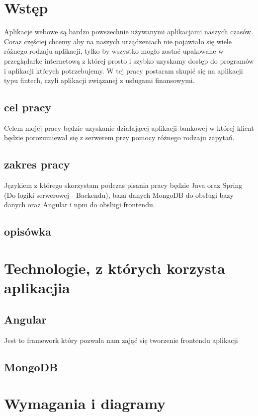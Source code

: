\documentclass[a4paper,11pt,twoside]{mgr}
\begin{document}
\pagestyle{empty}
\stronaTytulowa
\cleardoublepage

\tableofcontents

\pagestyle{fancy}

\chapter*{Wstęp}
Aplikacje webowe są bardzo powszechnie używanymi aplikacjami naszych czasów. Coraz częściej chcemy aby na naszych urządzeniach nie pojawiało się wiele różnego rodzaju aplikacji, tylko by wszystko mogło zostać upakowane w przeglądarke internetową z której prosto i szybko uzyskamy dostęp do programów i aplikacji których potrzebujemy. 
W tej pracy postaram skupić się na aplikacji typu fintech, czyli aplikacji związanej z usługami finansowymi.
\section*{cel pracy}
Celem mojej pracy będzie uzyskanie działającej aplikacji bankowej w której klient będzie porozumiewał się z serwerem przy pomocy różnego rodzaju zapytań.
\section*{zakres pracy}
Językiem z którego skorzystam podczas pisania pracy będzie Java oraz Spring (Do logiki serwerowej - Backendu), baza danych MongoDB do obsługi bazy danych oraz Angular i npm do obsługi frontendu.
\section*{opisówka}
\chapter{Technologie, z których korzysta aplikacjia}

\section{Angular}
Jest to framework który pozwala nam zająć się tworzenie frontendu aplikacji
\section{MongoDB}
\chapter{Wymagania i diagramy}
\end{document}
